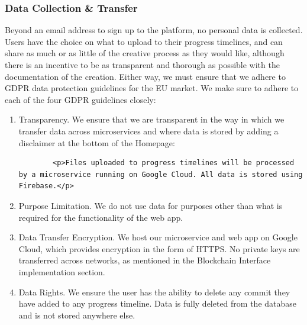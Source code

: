 \documentclass[12pt,a4paper]{article}
\begin{document}
\subsubsection{Data Collection \& Transfer}
Beyond an email address to sign up to the platform, no personal data is collected. Users have the choice on what to upload to their progress timelines, and can share as much or as little of the creative process as they would like, although there is an incentive to be as transparent and thorough as possible with the documentation of the creation. Either way, we must ensure that we adhere to GDPR data protection guidelines for the EU market. We make sure to adhere to each of the four GDPR guidelines closely:
\begin{enumerate}
    \item Transparency. We ensure that we are transparent in the way in which we transfer data across microservices and where data is stored by adding a disclaimer at the bottom of the Homepage:
    \begin{lstlisting}
        <p>Files uploaded to progress timelines will be processed by a microservice running on Google Cloud. All data is stored using Firebase.</p>
    \end{lstlisting}
    \item Purpose Limitation. We do not use data for purposes other than what is required for the functionality of the web app.
    \item Data Transfer Encryption. We host our microservice and web app on Google Cloud, which provides encryption in the form of HTTPS. No private keys are transferred across networks, as mentioned in the Blockchain Interface implementation section.
    \item Data Rights. We ensure the user has the ability to delete any commit they have added to any progress timeline. Data is fully deleted from the database and is not stored anywhere else.
\end{enumerate}
\end{document}
